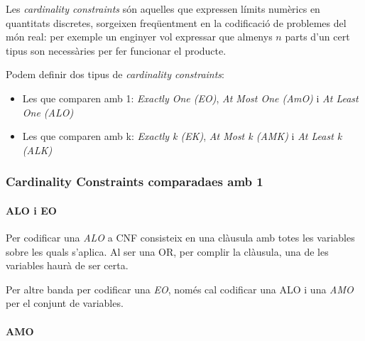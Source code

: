 \documentclass[11pt,a4paper,twoside]{report}
\begin{document}
  Les \textit{cardinality constraints} són aquelles que expressen límits numèrics en quantitats discretes, sorgeixen freqüentment en la codificació de problemes del món real: per exemple un enginyer vol expressar que almenys $n$ parts d'un cert tipus son necessàries per fer funcionar el producte.

  Podem definir dos tipus de \textit{cardinality constraints}:
  \begin{itemize}
    \item Les que comparen amb 1: \textit{Exactly One (EO)}, \textit{At Most One (AmO)} i \textit{At Least One (ALO)}
    \item Les que comparen amb k: \textit{Exactly k (EK)}, \textit{At Most k (AMK)} i \textit{At Least k (ALK)}
  \end{itemize}

  \subsubsection{Cardinality Constraints comparadaes amb 1}

  \paragraph*{ALO i EO}
  
  Per codificar una \textit{ALO} a CNF consisteix en una clàusula amb totes les variables sobre les quals s'aplica. Al ser una OR, per complir la clàusula, una de les variables haurà de ser certa.

  Per altre banda per codificar una \textit{EO}, només cal codificar una ALO i una \textit{AMO} per el conjunt de variables.
  
  \paragraph*{AMO}
\end{document}
